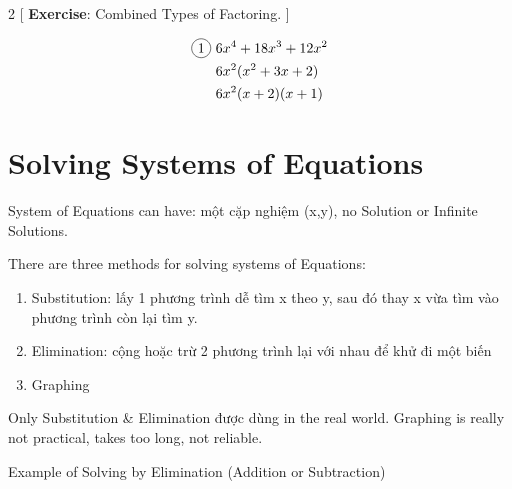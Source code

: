 \begin{multicols}{2}
[
  \textbf{Exercise}: Combined Types of Factoring.
]

\begin{align*}
  \circled{1}\ &6x^{4}+18x^{3}+12x^{2}\\
  &6x^{2}(x^{2}+3x+2)\\
  &6x^{2}(x+2)(x+1)
\end{align*}
\end{multicols}

\section{Solving Systems of Equations}

%
%

System of Equations can have: một cặp nghiệm (x,y), no Solution or Infinite Solutions.

\vspace{.4cm}

There are three methods for solving systems of Equations:

\begin{enumerate}
  \item Substitution: lấy 1 phương trình dễ tìm x theo y, sau đó thay x vừa tìm vào phương trình còn lại tìm y.
  \item Elimination: cộng hoặc trừ 2 phương trình lại với nhau để khử đi một biến
  \item Graphing
\end{enumerate}

Only Substitution \& Elimination được dùng in the real world. Graphing is really not practical, takes too long, not reliable.


Example of Solving by Elimination (Addition or Subtraction)

